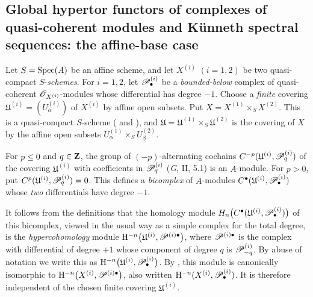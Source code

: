 \subsection{Global hypertor functors of complexes of
quasi-coherent modules and K\"unneth spectral sequences: the
affine-base case}
\label{subsection:III.6.6}

\begin{env}[6.6.1]
\label{III.6.6.1}
Let $S=\operatorname{Spec}(A)$ be an affine scheme, and let $X^{(i)}$
$(i=1,2)$ be two quasi-compact $S$-\emph{schemes}.  For $i=1,2$, let
$\mathscr{P}_\bullet^{(i)}$ be a \emph{bounded-below} complex of
quasi-coherent $\mathscr{O}_{X^{(i)}}$-modules whose differential has
degree $-1$.  Choose a \emph{finite} covering $\mathfrak U^{(i)}=(U_\alpha^{(i)})$
of $X^{(i)}$ by affine open subsets.  Put $X=X^{(1)}\times_S X^{(2)}$.
This is a quasi-compact $S$-scheme
( and ), and
$\mathfrak U=\mathfrak U^{(1)}\times_S\mathfrak U^{(2)}$ is the
covering of $X$ by the affine open subsets
$U_\alpha^{(1)}\times_SU_\beta^{(2)}$.

For $p\leq0$ and $q\in\mathbf{Z}$, the group of $(-p)$-alternating
cochains $C^{-p}(\mathfrak U^{(i)},\mathscr{P}_q^{(i)})$
of the covering $\mathfrak U^{(i)}$ with coefficients in
$\mathscr{P}_q^{(i)}$ (\emph{G}, II, 5.1) is an $A$-module.  For
$p>0$, put
$C^p(\mathfrak U^{(i)},\mathscr{P}_q^{(i)})=0$.  This defines a
\emph{bicomplex} of $A$-modules $C^\bullet(\mathfrak U^{(i)},\mathscr{P}_\bullet^{(i)})$
whose \emph{two} differentials have degree $-1$.

It follows from the definitions  that the
homology module $H_n\bigl(C^\bullet
(\mathfrak U^{(i)},\mathscr{P}_\bullet^{(i)})\bigr)$
of this bicomplex, viewed in the usual way as a simple complex
for the total degree, is the \emph{hypercohomology} module $\mathrm{H}^{-n}
\bigl(\mathfrak U^{(i)},\mathscr{P}^{(i)\bullet}\bigr)$,
where $\mathscr{P}^{(i)\bullet}$ is the complex with differential of
degree $+1$ whose component of degree $q$ is
$\mathscr{P}_{-q}^{(i)}$.  By abuse of notation we write this as $\mathrm{H}^{-n}
\bigl(\mathfrak U^{(i)},\mathscr{P}_\bullet^{(i)}\bigr)$.
By , this module is canonically isomorphic to $\mathrm{H}^{-n}\bigl(X^{(i)},\mathscr{P}^{(i)\bullet}\bigr)$,
also written
$\mathrm{H}^{-n}(X^{(i)},\mathscr{P}_\bullet^{(i)})$.  It is therefore
independent of the chosen finite covering
$\mathfrak U^{(i)}$.
\end{env}

